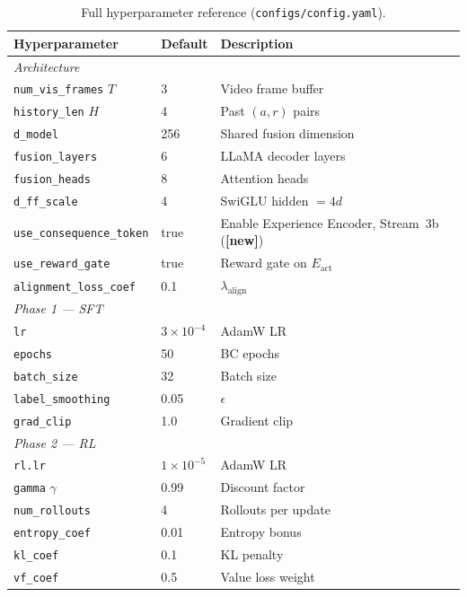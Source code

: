 \documentclass{article}
\newcommand{\Lact}{$E_{\mathrm{act}}$\xspace}   %
\newcommand{\NEW}{\textcolor{NewOrange}{\textbf{[new]}}\xspace}
\begin{document}
\begin{table}[h]
\centering
\caption{Full hyperparameter reference (\texttt{configs/config.yaml}).}
\label{tab:hparams}
\small
\begin{tabular}{lll}
\toprule
\textbf{Hyperparameter} & \textbf{Default} & \textbf{Description} \\
\midrule
\multicolumn{3}{l}{\textit{Architecture}} \\
\texttt{num\_vis\_frames} $T$        & 3     & Video frame buffer \\
\texttt{history\_len} $H$            & 4     & Past $(a,r)$ pairs \\
\texttt{d\_model}                    & 256   & Shared fusion dimension \\
\texttt{fusion\_layers}              & 6     & LLaMA decoder layers \\
\texttt{fusion\_heads}               & 8     & Attention heads \\
\texttt{d\_ff\_scale}                & 4     & SwiGLU hidden $= 4d$ \\
\texttt{use\_consequence\_token}     & true  & Enable Experience Encoder, Stream~3b (\NEW) \\
\texttt{use\_reward\_gate}           & true  & Reward gate on \Lact \\
\texttt{alignment\_loss\_coef}       & 0.1   & $\lambda_{\mathrm{align}}$ \\
\midrule
\multicolumn{3}{l}{\textit{Phase 1 — SFT}} \\
\texttt{lr}                          & $3\!\times\!10^{-4}$ & AdamW LR \\
\texttt{epochs}                      & 50    & BC epochs \\
\texttt{batch\_size}                 & 32    & Batch size \\
\texttt{label\_smoothing}            & 0.05  & $\epsilon$ \\
\texttt{grad\_clip}                  & 1.0   & Gradient clip \\
\midrule
\multicolumn{3}{l}{\textit{Phase 2 — RL}} \\
\texttt{rl.lr}                       & $1\!\times\!10^{-5}$ & AdamW LR \\
\texttt{gamma} $\gamma$              & 0.99  & Discount factor \\
\texttt{num\_rollouts}               & 4     & Rollouts per update \\
\texttt{entropy\_coef}               & 0.01  & Entropy bonus \\
\texttt{kl\_coef}                    & 0.1   & KL penalty \\
\texttt{vf\_coef}                    & 0.5   & Value loss weight \\
\bottomrule
\end{tabular}
\end{table}
\end{document}
